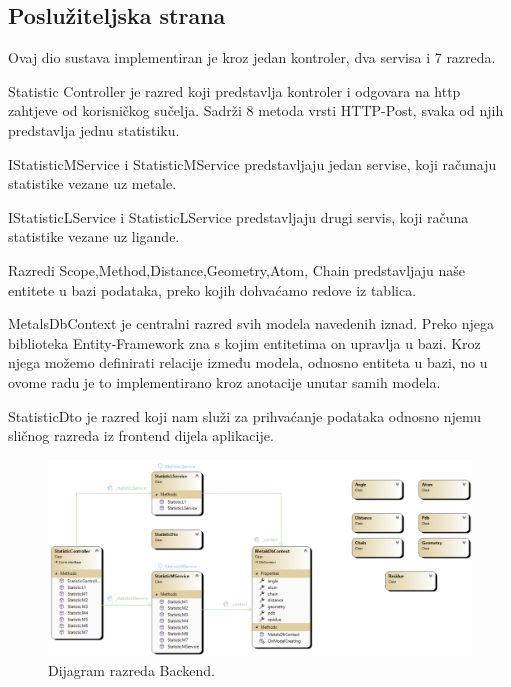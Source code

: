 \documentclass[times, utf8, zavrsni]{fer}
\begin{document}
\subsection{Poslužiteljska strana}
Ovaj dio sustava implementiran je kroz jedan kontroler, dva servisa i 7 razreda.

Statistic Controller je razred koji predstavlja kontroler i odgovara na http zahtjeve od korisničkog sučelja. Sadrži 8 metoda vrsti HTTP-Post, svaka od njih predstavlja
jednu statistiku. 

IStatisticMService i StatisticMService predstavljaju jedan servise, koji računaju statistike vezane uz metale.

IStatisticLService i StatisticLService predstavljaju drugi servis, koji računa statistike vezane uz ligande.

Razredi Scope,Method,Distance,Geometry,Atom, Chain predstavljaju naše entitete u bazi podataka, preko kojih dohvaćamo redove iz tablica.

MetalsDbContext je centralni razred svih modela navedenih iznad. Preko njega biblioteka Entity-Framework zna s kojim entitetima on upravlja u bazi.
Kroz njega možemo definirati relacije između modela, odnosno entiteta u bazi, no u ovome radu je to implementirano kroz anotacije unutar samih modela.

StatisticDto je razred koji nam služi za prihvaćanje podataka odnosno njemu sličnog razreda iz  frontend dijela aplikacije.

  \begin{figure}[!htb]
	\centering
	\hspace*{-2.5cm}
	 \includegraphics[width=\dimexpr\paperwidth-2cm,height=\paperheight,keepaspectratio]
	{./img/backend.png}
		\centering
                      \caption{Dijagram razreda Backend.}
    \end{figure}
\end{document}
